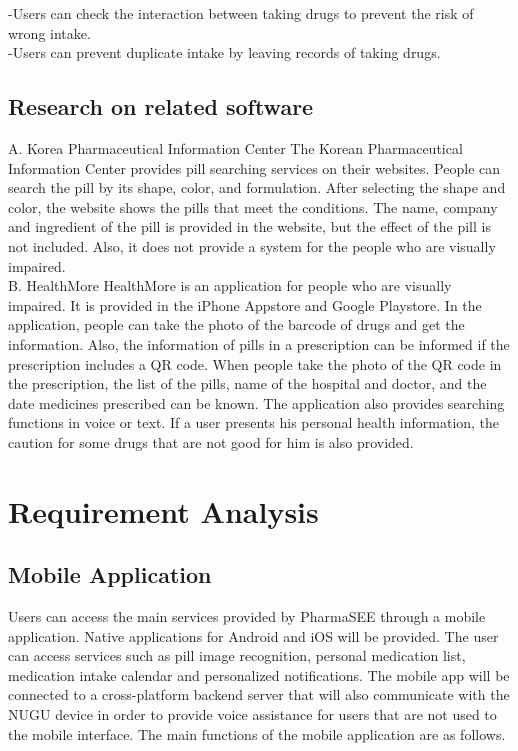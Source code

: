 \documentclass[conference]{IEEEtran}
\begin{document}
-Users can check the interaction between taking drugs to prevent the risk of wrong intake.\\

-Users can prevent duplicate intake by leaving records of taking drugs.\\

\subsection{Research on related  software}
A. Korea Pharmaceutical Information Center
The Korean Pharmaceutical Information Center provides pill searching services on their websites. People can search the pill by its shape, color, and formulation. After selecting the shape and color, the website shows the pills that meet the conditions. The name, company and ingredient of the pill is provided in the website, but the effect of the pill is not included. Also, it does not provide a system for the people who are visually impaired.\\

B. HealthMore
HealthMore is an application for people who are visually impaired. It is provided in the  iPhone Appstore and Google Playstore. In the application, people can take the photo of the barcode of drugs and get the information. Also, the information of pills in a prescription can be informed if the prescription includes a QR code. When people take the photo of the QR code in the prescription, the list of the pills, name of the hospital and doctor, and the date medicines prescribed  can be known. The application also provides searching functions in voice or text. If a user presents his personal health information, the caution for some drugs that are not good for him is also provided.


\section{Requirement Analysis}
\subsection{Mobile Application}\label{AA}
Users can access the main services provided by PharmaSEE through a mobile application. Native applications for Android and iOS will be provided. The user can access services such as pill image recognition, personal medication list, medication intake calendar and personalized notifications. The mobile app will be connected to a cross-platform backend server that will also communicate with the NUGU device in order to provide voice assistance for users that are not used to the mobile interface. The main functions of the mobile application are as follows.\\
\end{document}
